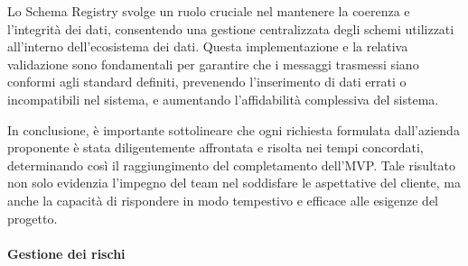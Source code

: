 Lo Schema Registry svolge un ruolo cruciale nel mantenere la coerenza e l'integrità dei dati, consentendo una gestione centralizzata degli schemi utilizzati all'interno dell'ecosistema dei dati. Questa implementazione e la relativa validazione sono fondamentali per garantire che i messaggi trasmessi siano conformi agli standard definiti, prevenendo l'inserimento di dati errati o incompatibili nel sistema, e aumentando l'affidabilità complessiva del sistema.

In conclusione, è importante sottolineare che ogni richiesta formulata dall’azienda proponente è stata diligentemente affrontata e risolta nei tempi concordati, determinando così il raggiungimento del completamento dell'MVP. Tale risultato non solo evidenzia l’impegno del team nel soddisfare le aspettative del cliente, ma anche la capacità di rispondere in modo tempestivo e efficace alle esigenze del progetto.


\paragraph{Gestione dei rischi}

